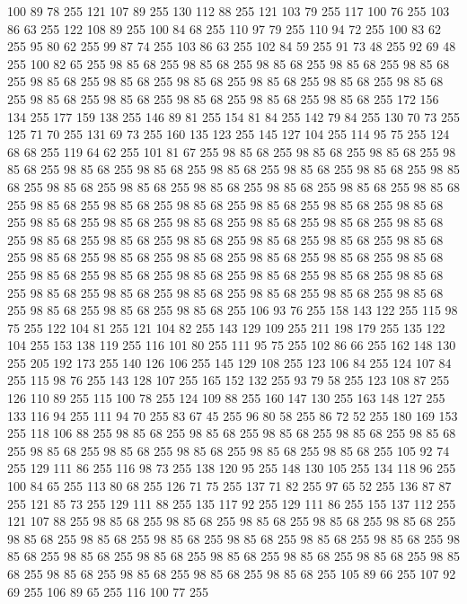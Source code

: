 100 89 78 255 121 107 89 255 130 112 88 255 121 103 79 255 117 100 76 255 103 86 63 255 122 108 89 255 100 84 68 255 110 97 79 255 110 94 72 255 100 83 62 255 95 80 62 255 99 87 74 255 103 86 63 255 102 84 59 255 91 73 48 255 92 69 48 255 100 82 65 255 98 85 68 255 98 85 68 255 98 85 68 255 98 85 68 255 98 85 68 255 98 85 68 255 98 85 68 255 98 85 68 255 98 85 68 255 98 85 68 255 98 85 68 255 98 85 68 255 98 85 68 255 98 85 68 255 98 85 68 255 98 85 68 255 172 156 134 255 177 159 138 255 146 89 81 255 154 81 84 255 142 79 84 255 130 70 73 255 125 71 70 255 131 69 73 255 160 135 123 255 145 127 104 255 114 95 75 255 124 68 68 255 119 64 62 255 101 81 67 255 98 85 68 255 98 85 68 255 98 85 68 255 98 85 68 255 98 85 68 255 98 85 68 255 98 85 68 255 98 85 68 255 98 85 68 255 98 85 68 255 98 85 68 255 98 85 68 255 98 85 68 255 98 85 68 255 98 85 68 255 98 85 68 255
98 85 68 255 98 85 68 255 98 85 68 255 98 85 68 255 98 85 68 255 98 85 68 255 98 85 68 255 98 85 68 255 98 85 68 255 98 85 68 255 98 85 68 255 98 85 68 255 98 85 68 255 98 85 68 255 98 85 68 255 98 85 68 255 98 85 68 255 98 85 68 255 98 85 68 255 98 85 68 255 98 85 68 255 98 85 68 255 98 85 68 255 98 85 68 255 98 85 68 255 98 85 68 255 98 85 68 255 98 85 68 255 98 85 68 255 98 85 68 255 98 85 68 255 98 85 68 255 98 85 68 255 98 85 68 255 98 85 68 255 98 85 68 255 98 85 68 255 98 85 68 255 98 85 68 255 106 93 76 255 158 143 122 255 115 98 75 255 122 104 81 255 121 104 82 255 143 129 109 255 211 198 179 255 135 122 104 255 153 138 119 255 116 101 80 255 111 95 75 255 102 86 66 255 162 148 130 255 205 192 173 255 140 126 106 255 145 129 108 255 123 106 84 255 124 107 84 255 115 98 76 255 143 128 107 255 165 152 132 255 93 79 58 255 123 108 87 255 126 110 89 255 115 100 78 255
124 109 88 255 160 147 130 255 163 148 127 255 133 116 94 255 111 94 70 255 83 67 45 255 96 80 58 255 86 72 52 255 180 169 153 255 118 106 88 255 98 85 68 255 98 85 68 255 98 85 68 255 98 85 68 255 98 85 68 255 98 85 68 255 98 85 68 255 98 85 68 255 98 85 68 255 98 85 68 255 105 92 74 255 129 111 86 255 116 98 73 255 138 120 95 255 148 130 105 255 134 118 96 255 100 84 65 255 113 80 68 255 126 71 75 255 137 71 82 255 97 65 52 255 136 87 87 255 121 85 73 255 129 111 88 255 135 117 92 255 129 111 86 255 155 137 112 255 121 107 88 255 98 85 68 255 98 85 68 255 98 85 68 255 98 85 68 255 98 85 68 255 98 85 68 255 98 85 68 255 98 85 68 255 98 85 68 255 98 85 68 255 98 85 68 255 98 85 68 255 98 85 68 255 98 85 68 255 98 85 68 255 98 85 68 255 98 85 68 255 98 85 68 255 98 85 68 255 98 85 68 255 98 85 68 255 98 85 68 255 105 89 66 255 107 92 69 255 106 89 65 255 116 100 77 255
